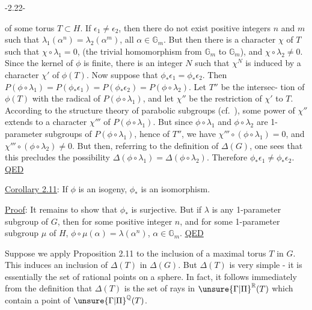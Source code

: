 \begin{center}-2.22-\end{center}
of some torus $T\subset H$. If $\epsilon_1\neq\epsilon_2$, then there do not exist positive integers $n$ and $m$ such that $\lambda_1(\alpha^n)=\lambda_2(\alpha^m)$, all $\alpha\in\mathbb G_m$. But then there is a character $\chi$ of $T$ such that $\chi\circ\lambda_1=0$, (the trivial homomorphism from $\mathbb G_m$ to $\mathbb G_m$), and $\chi\circ\lambda_2\neq0$. Since the kernel of $\phi$ is finite, there is an integer $N$ such that $\chi^N$ is induced by a character $\chi'$ of $\phi(T)$. Now suppose that $\phi_*\epsilon_1=\phi_*\epsilon_2$. Then $P(\phi\circ\lambda_1)=P(\phi_*\epsilon_1)=P(\phi_*\epsilon_2)=P(\phi\circ\lambda_2)$. Let $T''$ be the intersec-
tion of $\phi(T)$ with the radical of $P(\phi\circ\lambda_1)$, and let $\chi''$ be the restriction of $\chi'$ to $T$. According to the structure theory of parabolic subgroups (cf.\ \hspace{2cm}), some power of $\chi''$ extends to a character $\chi'''$ of $P(\phi\circ\lambda_1)$. But since $\phi\circ\lambda_1$ and $\phi\circ\lambda_2$ are 1-parameter subgroups of $P(\phi\circ\lambda_1)$, hence of $T''$, we have $\chi'''\circ(\phi\circ\lambda_1)=0$, and $\chi'''\circ(\phi\circ\lambda_2)\neq0$. But then, referring to the definition of $\Delta(G)$, one sees that this precludes the possibility $\Delta(\phi\circ\lambda_1)=\Delta(\phi\circ\lambda_2)$. Therefore $\phi_*\epsilon_1\neq\phi_*\epsilon_2$. \uline{QED}

\uline{Corollary 2.11}: If $\phi$ is an isogeny, $\phi_*$ is an isomorphism.

\uline{Proof}: It remains to show that $\phi_*$ is surjective. But if $\lambda$ is any 1-parameter subgroup of $G$, then for some positive integer $n$, and for some 1-parameter subgroup $\mu$ of $H$, $\phi\circ\mu(\alpha)=\lambda(\alpha^n)$, $\alpha\in\mathbb G_m$. \uline{QED}

Suppose we apply Proposition 2.11 to the inclusion of a maximal torus $T$ in $G$. This induces an inclusion of $\Delta(T)$ in $\Delta(G)$. But $\Delta(T)$ is very simple - it is essentially the set of rational points on a sphere. In fact, it follows immediately from the definition that $\Delta(T)$ is the set of rays in $\unsure{\Gamma|\Pi}^{\mathbb R}(T)$ which contain a point of $\unsure{\Gamma|\Pi}^{\mathbb Q}(T)$.
